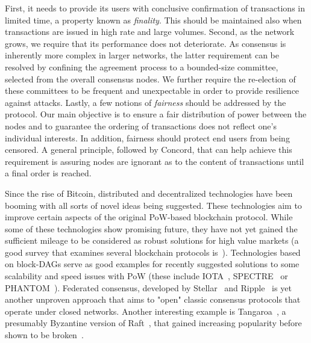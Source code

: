 First, it needs to provide its users with conclusive confirmation of transactions in limited time, a property known as \emph{finality}. This should be maintained also when transactions are issued in high rate and large volumes.
Second, as the network grows, we require that its performance does not deteriorate. As consensus is inherently more complex in larger networks, the latter requirement can be resolved by confining the agreement process to a bounded-size committee, selected from the overall consensus nodes. We further require the re-election of these committees to be frequent and unexpectable in order to provide resilience against attacks. 
Lastly, a few notions of \emph{fairness} should be addressed by the protocol. Our main objective is to ensure a fair distribution of power between the nodes and to guarantee the ordering of transactions does not reflect one's individual interests. In addition, fairness should protect end users from being censored. A general principle, followed by Concord, that can help achieve this requirement is assuring nodes are ignorant as to the content of transactions until a final order is reached.

Since the rise of Bitcoin, distributed and decentralized technologies have been booming with all sorts of novel ideas being suggested. These technologies aim to improve certain aspects of the original PoW-based blockchain protocol. While some of these technologies show promising future, they have not yet gained the sufficient mileage to be considered as robust solutions for high value markets (a good survey that examines several blockchain protocols is~\cite{blockchain_in_wild}). Technologies based on block-DAGs serve as good examples for recently suggested solutions to some scalability and speed issues with PoW (these include IOTA~\cite{IOTA}, SPECTRE~\cite{Spectre} or PHANTOM~\cite{Phantom}). Federated consensus, developed by Stellar~\cite{Stellar} and Ripple~\cite{Ripple} is yet another unproven approach that aims to "open" classic consensus protocols that operate under closed networks. Another interesting example is Tangaroa~\cite{Tangaroa}, a presumably Byzantine version of Raft~\cite{Raft}, that gained increasing popularity before shown to be broken~\cite{blockchain_in_wild}. 

